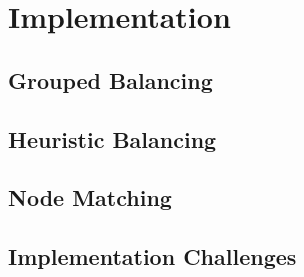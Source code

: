 \chapter{Implementation}
\section{Grouped Balancing}

\section{Heuristic Balancing}

\section{Node Matching}

\section{Implementation Challenges}